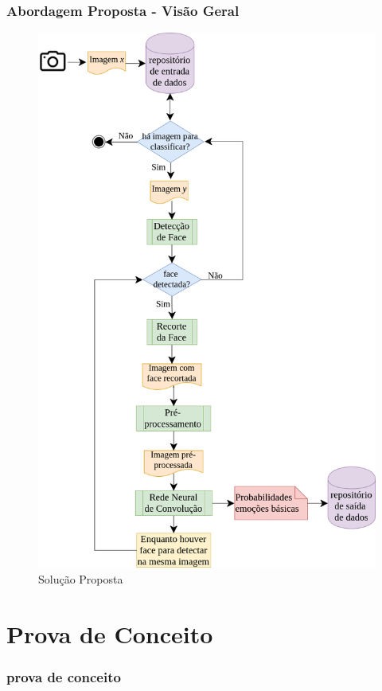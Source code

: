 \documentclass{beamer}
\begin{document}
\begin{frame}
\frametitle{Abordagem Proposta - Visão Geral}
\begin{figure}
\centering
\includegraphics[scale=0.17]{figuras/arquitetura.png}
\caption{Solução Proposta}
\label{fig:arquitetura}
\end{figure}
\end{frame}


\section{Prova de Conceito}
\begin{frame}
 \frametitle{prova de conceito}
\end{frame}
\end{document}
